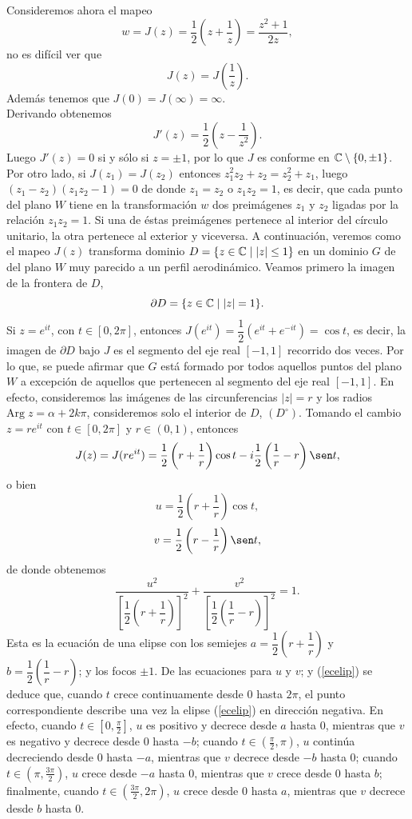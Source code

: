 Consideremos ahora el mapeo 
\begin{equation}
	w=J(z)=\dfrac{1}{2}\left(z+\dfrac{1}{z}\right)=\dfrac{z^2+1}{2z},
\end{equation}
no es difícil ver que 
\begin{equation}\label{derj}
	J(z)=J\left(\dfrac{1}{z}\right).
\end{equation}
Además tenemos que $J(0)=J(\infty)=\infty$. \\
Derivando obtenemos $$J'(z)=\dfrac{1}{2}\left(z-\dfrac{1}{z^2}\right).$$
Luego $J'(z)=0$ si y sólo si $z=\pm 1$, por lo que $J$ es conforme en $\mathbb{C}\setminus\{0,\pm 1\}$. Por otro lado, si $J(z_1)=J(z_2)$ entonces $z_{1}^2z_2+z_2=z_{2}^2+z_1$, luego $(z_1-z_2)(z_1z_2-1)=0$ de donde $z_1=z_2$ o $z_1z_2=1$, es decir, que cada punto del plano $W$ tiene en la transformación $w$ dos preimágenes $z_1$ y $z_2$ ligadas por la relación $z_1z_2=1$. Si una de éstas preimágenes pertenece al interior del círculo unitario, la otra pertenece al exterior  y viceversa. A continuación, veremos como el mapeo $J(z)$ transforma dominio $D=\{z\in \mathbb{C}\mid |z|\leq 1 \}$ en un dominio $G$ de del plano $W$ muy parecido a un perfil aerodinámico. Veamos primero la imagen de la frontera de $D$, $$\partial D=\{z\in\mathbb{C}\mid |z|=1\}.$$
Si $z=e^{it}$, con $t\in[0,2\pi]$, entonces $J(e^{it})=\dfrac{1}{2}\left(e^{it}+e^{-it}\right)=\cos t$, es decir, la imagen de $\partial D$ bajo $J$ es el segmento del eje real $[-1,1]$ recorrido dos veces. Por lo que, se puede afirmar que $G$ está formado por todos aquellos puntos del plano $W$  a excepción de aquellos que pertenecen al segmento del eje real $[-1,1]$. En efecto, consideremos las imágenes de las circunferencias $|z|=r$ y los radios $\mbox{Arg}\; z=\alpha+2k\pi$, consideremos solo el interior de $D$, $(D^{\circ})$. Tomando el cambio $z=re^{it}$ con $t\in[0,2\pi]$ y $r\in (0,1)$, entonces
$$J(z)=J(re^{it})=\dfrac{1}{2}\left(r+\dfrac{1}{r}\right)\cos t-i\dfrac{1}{2}\left(\dfrac{1}{r}-r\right)\sen t,$$
o bien 
$$u=\dfrac{1}{2}\left(r+\dfrac{1}{r}\right)\cos t,$$
$$v=\dfrac{1}{2}\left(r-\dfrac{1}{r}\right)\sen t,$$
de donde obtenemos 
\begin{equation}\label{ecelip}
	\dfrac{u^2}{\left[\dfrac{1}{2}\left(r+\dfrac{1}{r}\right)\right]^2} +\dfrac{v^2}{\left[\dfrac{1}{2}\left(\dfrac{1}{r}-r\right)\right]^2}=1.
\end{equation}
Esta es la ecuación de una elipse con los semiejes $a=\dfrac{1}{2}\left(r+\dfrac{1}{r}\right)$ y $b=\dfrac{1}{2}\left(\dfrac{1}{r}-r\right)$; y los focos $\pm 1$. De las ecuaciones para $u$ y $v$; y (\ref{ecelip}) se deduce que, cuando $t$ crece continuamente desde $0$ hasta $2\pi$, el punto correspondiente describe una vez la elipse (\ref{ecelip}) en dirección negativa. En efecto, cuando $t\in[0,\frac{\pi}{2}]$, $u$ es positivo y decrece desde $a$ hasta $0$, mientras que $v$ es negativo y decrece desde $0$ hasta $-b$; cuando $t\in(\frac{\pi}{2},\pi)$, $u$ continúa decreciendo desde $0$ hasta $-a$, mientras que $v$ decrece desde $-b$ hasta $0$; cuando $t\in (\pi ,\frac{3\pi}{2})$, $u$ crece desde $-a$ hasta $0$, mientras que $v$ crece desde $0$ hasta $b$; finalmente, cuando $t\in (\frac{3\pi}{2},2\pi)$, $u$ crece desde $0$ hasta $a$, mientras que $v$ decrece desde $b$ hasta $0$.\\
